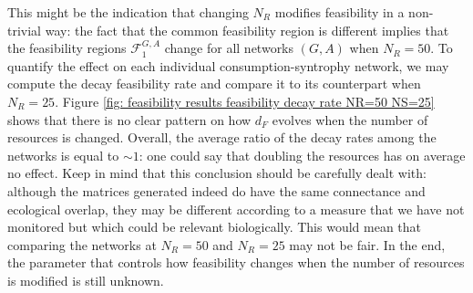 \documentclass[12pt, titlepage]{report}
\begin{document}
\noindent This might be the indication that changing $N_R$ modifies feasibility in a non-trivial way: the fact that the common feasibility region is different implies that the feasibility regions $\mathcal{F}_1^{G,A}$ change for all networks $(G,A)$ when $N_R=50$.
To quantify the effect on each individual consumption-syntrophy network, we may compute the decay feasibility rate and compare it to its counterpart when $N_R=25$. Figure \ref{fig: feasibility results feasibility decay rate NR=50 NS=25} shows that there is no clear pattern on how $d_F$ evolves when the number of resources is changed. Overall, the average ratio of the decay rates among the networks is equal to $\sim 1$: one could say that doubling the resources has on average no effect. Keep in mind that this conclusion should be carefully dealt with: although the matrices generated indeed do have the same connectance and ecological overlap, they may be different according to a measure that we have not monitored but which could be relevant biologically. This would mean that comparing the networks at $N_R=50$ and $N_R=25$ may not be fair. In the end, the parameter that controls how feasibility changes when the number of resources is modified is still unknown.
\end{document}
